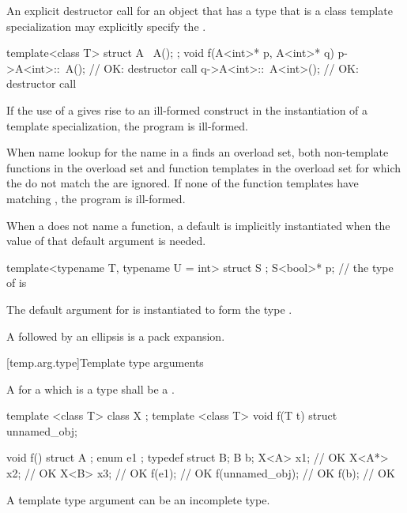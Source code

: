 \pnum
An explicit destructor call for an object that has a type
that is a class template specialization may explicitly specify the
.
\begin{example}
\begin{codeblock}
template<class T> struct A {
  ~A();
};
void f(A<int>* p, A<int>* q) {
  p->A<int>::~A();              // OK: destructor call
  q->A<int>::~A<int>();         // OK: destructor call
}
\end{codeblock}
\end{example}

\pnum
If the use of a
gives rise to an ill-formed construct in the instantiation of a
template specialization, the program is ill-formed.

\pnum
When name lookup for the name in a
finds an overload set, both non-template functions in the overload
set and function templates in the overload set for
which the
do not match the
are ignored.
If none of the function templates have matching
,
the program is ill-formed.

\pnum
When a  does not name a function,
a default  is
implicitly instantiated
when the value of that default argument is needed.
\begin{example}
\begin{codeblock}
template<typename T, typename U = int> struct S { };
S<bool>* p;         // the type of  is 
\end{codeblock}
The default argument for  is instantiated to form the type .
\end{example}

\pnum
A  followed by an ellipsis is
a pack expansion.

[temp.arg.type]{Template type arguments}

\pnum
A
for a
which is a type
shall be a
.

\pnum
\begin{example}
\begin{codeblock}
template <class T> class X { };
template <class T> void f(T t) { }
struct { } unnamed_obj;

void f() {
  struct A { };
  enum { e1 };
  typedef struct { } B;
  B b;
  X<A> x1;          // OK
  X<A*> x2;         // OK
  X<B> x3;          // OK
  f(e1);            // OK
  f(unnamed_obj);   // OK
  f(b);             // OK
}
\end{codeblock}
\end{example}
\begin{note}
A template type argument can be an incomplete type.
\end{note}

